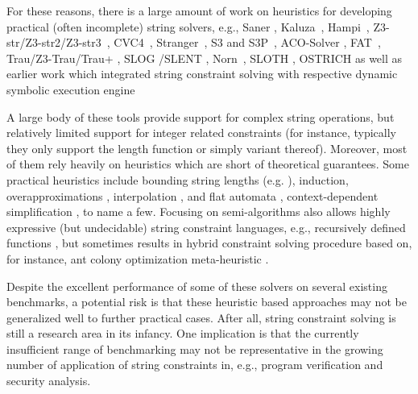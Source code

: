 For these reasons, there is a large amount of work on heuristics for developing practical (often incomplete) string solvers, e.g., Saner \cite{Saner08}, Kaluza~\cite{Berkeley-JavaScript}, Hampi~\cite{HAMPI},  Z3-str/Z3-str2/Z3-str3~\cite{Z3-str,Z3-str2,Z3-str3}, CVC4~\cite{cvc4}, Stranger~\cite{YABI14,Stranger},  S3 and S3P~\cite{S3,TCJ16}, ACO-Solver \cite{ThomeSBB17}, FAT~\cite{Abdulla17}, Trau/Z3-Trau/Trau+ \cite{AbdullaACDHRR18-trau,AbdullaA+19,Z3-trau}, 
%
SLOG \cite{fang-yu-circuits}/SLENT \cite{WC+18}, Norn~\cite{Abdulla14}, SLOTH \cite{HJLRV18}, OSTRICH \cite{CHL+19}
as well as earlier work \cite{BTV09,RVG12} which integrated string constraint solving with respective dynamic symbolic execution engine %

%


A large body of these tools provide support for complex string operations, but relatively limited support for integer related constraints (for instance, typically they only support the length function or simply variant thereof). Moreover, most of them rely heavily on heuristics which are short of theoretical guarantees. Some practical heuristics include bounding string lengths (e.g. \cite{HAMPI,Berkeley-JavaScript,BTV09}),  induction, overapproximations \cite{Stranger,YABI14}, interpolation \cite{Abdulla14}, and flat automata \cite{Abdulla17}, context-dependent simplification \cite{ReynoldsWBBLT17}, to name a few. 
Focusing on semi-algorithms also allows highly expressive (but undecidable) 
string  constraint languages, e.g., recursively defined functions \cite{S3,TCJ16}, but sometimes results in  hybrid constraint solving procedure based on, for instance, 
ant colony optimization meta-heuristic \cite{ThomeSBB17}. 

Despite the excellent performance of some of these solvers on several existing benchmarks, a potential risk is that these heuristic based approaches may not be generalized well to further practical cases. After all,  string constraint solving is still a research area in its infancy. One implication is that the currently insufficient range of benchmarking may not be representative in the growing number of application of string constraints in, e.g., program verification and security analysis. 


